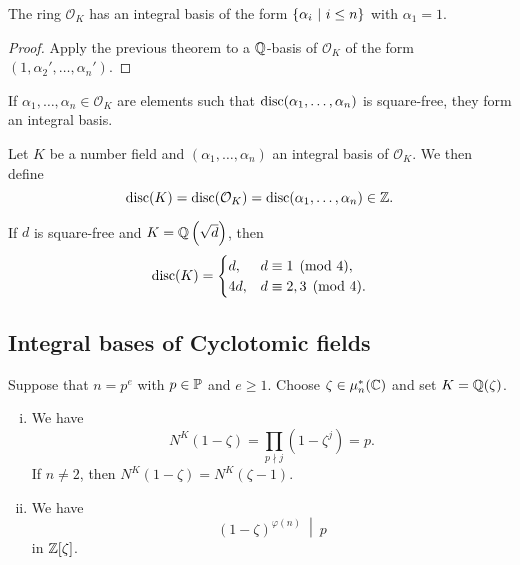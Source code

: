 \begin{posledica}
The ring $\mathcal{O}_K$ has an integral basis of the form
$\setb{\alpha_i}{i \leq n}$ with $\alpha_1 = 1$.
\end{posledica}

\begin{proof}
Apply the previous theorem to a $\Q$-basis of $\mathcal{O}_K$ of
the form $(1, \alpha_2', \dots, \alpha_n')$.
\end{proof}

\begin{opomba}
If $\alpha_1, \dots, \alpha_n \in \mathcal{O}_K$ are elements such
that $\disc(\alpha_1, \dots, \alpha_n)$ is square-free, they form
an integral basis.
\end{opomba}

\begin{definicija}
Let $K$ be a number field and $(\alpha_1, \dots, \alpha_n)$ an
integral basis of $\mathcal{O}_K$. We then define
\[
\disc(K) =
\disc(\mathcal{O}_K) =
\disc(\alpha_1, \dots, \alpha_n) \in \Z.
\]
\end{definicija}

\begin{opomba}
If $d$ is square-free and $K = \Q \br{\sqrt{d}}$, then
\[
\disc(K) =
\begin{cases}
 d, & d \equiv 1 \pmod{4},   \\
4d, & d \equiv 2, 3 \pmod{4}.
\end{cases}
\]
\end{opomba}

\newpage

\subsection{Integral bases of Cyclotomic fields}

\begin{lema}
\label{alg_int:lm:pp}
Suppose that $n = p^e$ with $p \in \P$ and $e \geq 1$. Choose
$\zeta \in \mu_n^*(\C)$ and set $K = \Q(\zeta)$.

\begin{enumerate}[i)]
\item We have
\[
N^K(1-\zeta) = \prod_{p \nmid j} (1-\zeta^j) = p.
\]
If $n \ne 2$, then $N^K(1-\zeta) = N^K(\zeta-1)$.
\item We have
\[
\left.(1-\zeta)^{\varphi(n)}~\middle\vert~p\right.
\]
in $\Z[\zeta]$.
\end{enumerate}
\end{lema}

